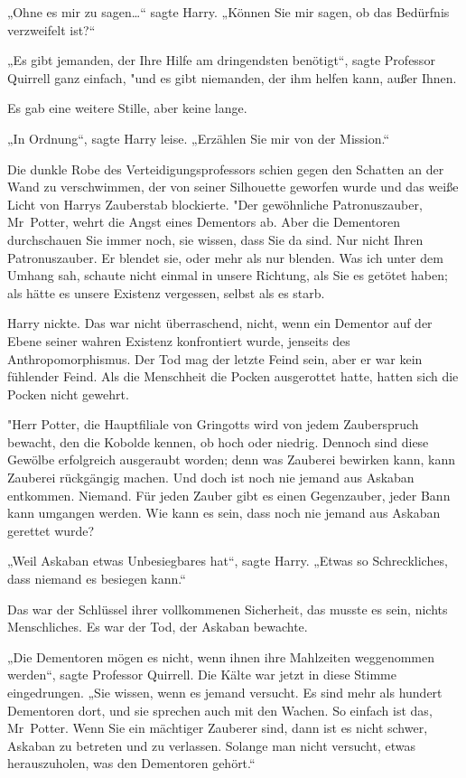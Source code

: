 {„Ohne es mir zu sagen…“ sagte Harry. „Können Sie mir sagen, ob das Bedürfnis verzweifelt ist?“

„Es gibt jemanden, der Ihre Hilfe am dringendsten benötigt“, sagte Professor Quirrell ganz einfach, "und es gibt niemanden, der ihm helfen kann, außer Ihnen.

Es gab eine weitere Stille, aber keine lange.

„In Ordnung“, sagte Harry leise. „Erzählen Sie mir von der Mission.“

Die dunkle Robe des Verteidigungsprofessors schien gegen den Schatten an der Wand zu verschwimmen, der von seiner Silhouette geworfen wurde und das weiße Licht von Harrys Zauberstab blockierte. "Der gewöhnliche Patronuszauber, Mr~Potter, wehrt die Angst eines Dementors ab. Aber die Dementoren durchschauen Sie immer noch, sie wissen, dass Sie da sind. Nur nicht Ihren Patronuszauber. Er blendet sie, oder mehr als nur blenden. Was ich unter dem Umhang sah, schaute nicht einmal in unsere Richtung, als Sie es getötet haben; als hätte es unsere Existenz vergessen, selbst als es starb.

Harry nickte. Das war nicht überraschend, nicht, wenn ein Dementor auf der Ebene seiner wahren Existenz konfrontiert wurde, jenseits des Anthropomorphismus. Der Tod mag der letzte Feind sein, aber er war kein fühlender Feind. Als die Menschheit die Pocken ausgerottet hatte, hatten sich die Pocken nicht gewehrt.

"Herr Potter, die Hauptfiliale von Gringotts wird von jedem Zauberspruch bewacht, den die Kobolde kennen, ob hoch oder niedrig. Dennoch sind diese Gewölbe erfolgreich ausgeraubt worden; denn was Zauberei bewirken kann, kann Zauberei rückgängig machen. Und doch ist noch nie jemand aus Askaban entkommen. Niemand. Für jeden Zauber gibt es einen Gegenzauber, jeder Bann kann umgangen werden. Wie kann es sein, dass noch nie jemand aus Askaban gerettet wurde?

„Weil Askaban etwas Unbesiegbares hat“, sagte Harry. „Etwas so Schreckliches, dass niemand es besiegen kann.“

Das war der Schlüssel ihrer vollkommenen Sicherheit, das musste es sein, nichts Menschliches. Es war der Tod, der Askaban bewachte.

„Die Dementoren mögen es nicht, wenn ihnen ihre Mahlzeiten weggenommen werden“, sagte Professor Quirrell. Die Kälte war jetzt in diese Stimme eingedrungen. „Sie wissen, wenn es jemand versucht. Es sind mehr als hundert Dementoren dort, und sie sprechen auch mit den Wachen. So einfach ist das, Mr~Potter. Wenn Sie ein mächtiger Zauberer sind, dann ist es nicht schwer, Askaban zu betreten und zu verlassen. Solange man nicht versucht, etwas herauszuholen, was den Dementoren gehört.“

}
